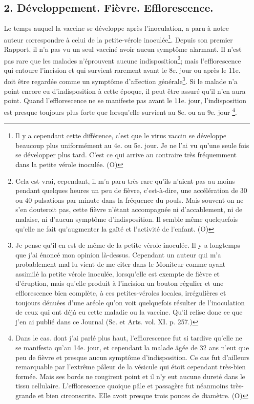\subsection{2. Développement. Fièvre. Efflorescence.}
Le temps auquel la vaccine se développe après l'inoculation, a paru à notre auteur correspondre à celui de la petite-vérole inoculée\footnote{Il y a cependant cette différence, c'est que le virus vaccin se développe beaucoup plus uniformément au 4e. ou 5e. jour. Je ne l'ai vu qu'une seule fois se développer plus tard. C'est ce qui arrive au contraire très fréquemment dans la petite vérole inoculée. (O)}.
\setcounter{page}{357}
Depuis son premier Rapport, il n'a pas vu un seul vacciné avoir aucun symptôme alarmant. Il n'est pas rare que les malades n'éprouvent aucune indisposition\footnote{Cela est vrai, cependant, il m'a paru très rare qu'ils n'aient pas au moins pendant quelques heures un peu de fièvre, c'est-à-dire, une accélération de 30 ou 40 pulsations par minute dans la fréquence du pouls. Mais souvent on ne s'en douteroit pas, cette fièvre n'étant accompagnée ni d'accablement, ni de malaise, ni d'aucun symptôme d'indisposition. Il semble même quelquefois qu'elle ne fait qu'augmenter la gaîté et l'activité de l'enfant. (O)}; mais l'efflorescence qui entoure l'incision et qui survient rarement avant le 8e. jour ou après le 11e. doit être regardée comme un symptôme d'affection générale\footnote{Je pense qu'il en est de même de la petite vérole inoculée. Il y a longtemps que j'ai énoncé mon opinion là-dessus. Cependant un auteur qui m'a probablement mal lu vient de me citer dans le Moniteur comme ayant assimilé la petite vérole inoculée, lorsqu'elle est exempte de fièvre et d'éruption, mais qu'elle produit à l'incision un bouton régulier et une efflorescence bien complète, à ces petites-véroles locales, irrégulières et toujours dénuées d’une aréole qu’on voit quelquefois résulter de l’inoculation de ceux qui ont déjà eu cette maladie ou la vaccine. Qu’il relise donc ce que j’en ai publié dans ce Journal (Sc. et Arts. vol. XI. p. 257.)}. Si le malade n'a point encore eu d'indisposition à cette époque, il peut être assuré qu'il n'en aura point.
Quand l'efflorescence ne se manifeste pas\setcounter{page}{358} avant le 11e. jour, l’indisposition est presque toujours plus forte que lorsqu’elle survient au 8e. ou au 9e. jour \footnote{Dans le cas. dont j’ai parlé plus haut, l’efflorescence fut si tardive qu’elle ne se manifesta qu’au 14e. jour, et cependant la malade âgée de 32 ans n’eut que peu de fièvre et presque aucun symptôme d’indisposition. Ce cas fut d’ailleurs remarquable par l’extrême pâleur de la vésicule qui étoit cependant très-bien formée. Mais ses bords ne rougirent point et il n’y eut aucune dureté dans le tissu cellulaire. L’efflorescence quoique pâle et passagère fut néanmoins très-grande et bien circonscrite. Elle avoit presque trois pouces de diamètre. (O)}.
